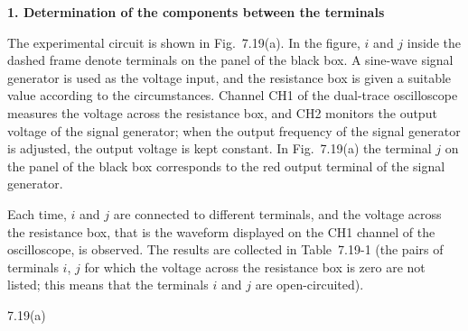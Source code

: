 \textbf{1. Determination of the components between the terminals}

The experimental circuit is shown in Fig.~7.19(a). In the figure, $i$ and $j$ inside the dashed frame denote terminals on the panel of the black box. A sine-wave signal generator is used as the voltage input, and the resistance box is given a suitable value according to the circumstances. Channel CH1 of the dual-trace oscilloscope measures the voltage across the resistance box, and CH2 monitors the output voltage of the signal generator; when the output frequency of the signal generator is adjusted, the output voltage is kept constant. In Fig.~7.19(a) the terminal $j$ on the panel of the black box corresponds to the red output terminal of the signal generator.

Each time, $i$ and $j$ are connected to different terminals, and the voltage across the resistance box, that is the waveform displayed on the CH1 channel of the oscilloscope, is observed. The results are collected in Table~7.19-1 (the pairs of terminals $i$, $j$ for which the voltage across the resistance box is zero are not listed; this means that the terminals $i$ and $j$ are open-circuited).

\begin{figbox}{7.19(a)}
\end{figbox}

